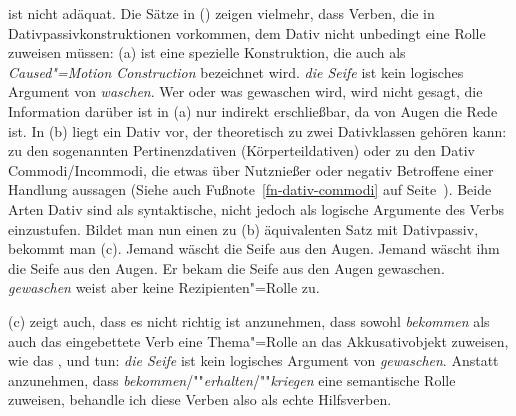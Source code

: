 ist nicht adäquat.
Die Sätze in () zeigen vielmehr, dass Verben, die in Dativpassivkonstruktionen
vorkommen, dem Dativ nicht unbedingt eine Rolle zuweisen müssen:
(a) ist eine spezielle Konstruktion, die auch als \emph{Caused"=Motion
Construction} bezeichnet wird. \emph{die Seife} ist kein logisches
Argument von \emph{waschen}. Wer oder was gewaschen wird, wird nicht gesagt,
die Information darüber ist in (a) nur indirekt erschließbar, da
von Augen die Rede ist. In (b) liegt ein Dativ vor, der theoretisch
zu zwei Dativklassen gehören kann: zu den sogenannten Pertinenzdativen
(Körperteildativen) oder zu den Dativ Commodi/Incommodi,
die etwas über Nutznießer oder negativ Betroffene einer Handlung aussagen
(Siehe auch Fußnote~\ref{fn-dativ-commodi} auf Seite~\pageref{fn-dativ-commodi}). Beide Arten
Dativ sind als syntaktische, nicht jedoch als logische Argumente des Verbs einzustufen.
Bildet man nun einen zu (b) äquivalenten Satz mit Dativpassiv,
bekommt man (c).
\eal
\label{ex-bekommen-passive-und-waschen}
\ex Jemand wäscht     die Seife aus den Augen.
\ex Jemand wäscht ihm die Seife aus den Augen.
\ex\label{ex-er-bekam-die-seife-aus-den-augen-gewaschen}
Er bekam die Seife aus den Augen gewaschen.
\zl
\emph{gewaschen} weist aber keine Rezipienten"=Rolle zu.

(c) zeigt auch, dass es nicht richtig ist anzunehmen, dass sowohl \emph{bekommen} als auch das
eingebettete Verb eine Thema"=Rolle an das Akkusativobjekt zuweisen,
wie das \citet[]{Haider86}, \citet[]{HM94a}
und \citet[]{Kathol2000a} tun: \emph{die Seife} ist kein logisches
Argument von \emph{gewaschen}.
Anstatt anzunehmen, dass \emph{bekommen}/""\emph{erhalten}/""\emph{kriegen} 
eine semantische Rolle zuweisen, behandle ich diese Verben also als echte Hilfsverben.



